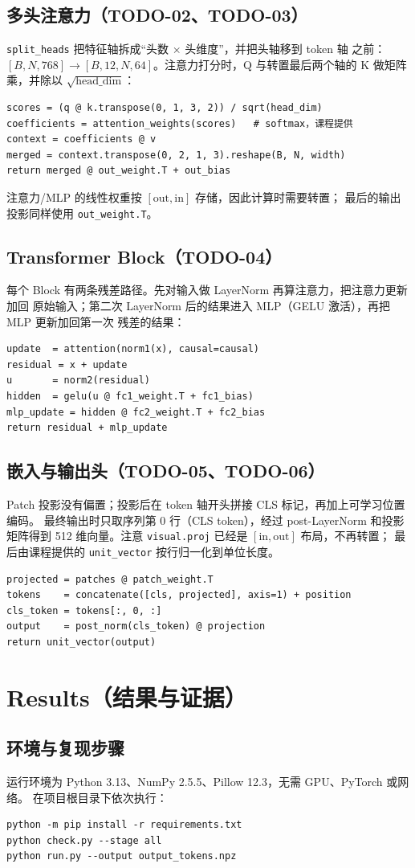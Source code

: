 \documentclass[a4paper,12pt]{article}
\begin{document}
\subsection{多头注意力（TODO-02、TODO-03）}
\texttt{split\_heads} 把特征轴拆成“头数 $\times$ 头维度”，并把头轴移到 token 轴
之前：$[B,N,768]\rightarrow[B,12,N,64]$。注意力打分时，Q 与转置最后两个轴的 K
做矩阵乘，并除以 $\sqrt{\text{head\_dim}}$：
\begin{verbatim}
scores = (q @ k.transpose(0, 1, 3, 2)) / sqrt(head_dim)
coefficients = attention_weights(scores)   # softmax，课程提供
context = coefficients @ v
merged = context.transpose(0, 2, 1, 3).reshape(B, N, width)
return merged @ out_weight.T + out_bias
\end{verbatim}
注意力/MLP 的线性权重按 $[\text{out},\text{in}]$ 存储，因此计算时需要转置；
最后的输出投影同样使用 \texttt{out\_weight.T}。
\subsection{Transformer Block（TODO-04）}
每个 Block 有两条残差路径。先对输入做 LayerNorm 再算注意力，把注意力更新加回
原始输入；第二次 LayerNorm 后的结果进入 MLP（GELU 激活），再把 MLP 更新加回第一次
残差的结果：
\begin{verbatim}
update  = attention(norm1(x), causal=causal)
residual = x + update
u       = norm2(residual)
hidden  = gelu(u @ fc1_weight.T + fc1_bias)
mlp_update = hidden @ fc2_weight.T + fc2_bias
return residual + mlp_update
\end{verbatim}
\subsection{嵌入与输出头（TODO-05、TODO-06）}
Patch 投影没有偏置；投影后在 token 轴开头拼接 CLS 标记，再加上可学习位置编码。
最终输出时只取序列第 0 行（CLS token），经过 post-LayerNorm 和投影矩阵得到 512
维向量。注意 \texttt{visual.proj} 已经是 $[\text{in},\text{out}]$ 布局，不再转置；
最后由课程提供的 \texttt{unit\_vector} 按行归一化到单位长度。
\begin{verbatim}
projected = patches @ patch_weight.T
tokens    = concatenate([cls, projected], axis=1) + position
cls_token = tokens[:, 0, :]
output    = post_norm(cls_token) @ projection
return unit_vector(output)
\end{verbatim}
\section{Results（结果与证据）}
\subsection{环境与复现步骤}
运行环境为 Python 3.13、NumPy 2.5.5、Pillow 12.3，无需 GPU、PyTorch 或网络。
在项目根目录下依次执行：
\begin{verbatim}
python -m pip install -r requirements.txt
python check.py --stage all
python run.py --output output_tokens.npz
\end{verbatim}
\end{document}
